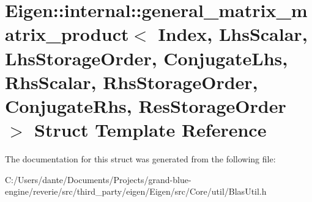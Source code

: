 \hypertarget{struct_eigen_1_1internal_1_1general__matrix__matrix__product}{}\section{Eigen\+::internal\+::general\+\_\+matrix\+\_\+matrix\+\_\+product$<$ Index, Lhs\+Scalar, Lhs\+Storage\+Order, Conjugate\+Lhs, Rhs\+Scalar, Rhs\+Storage\+Order, Conjugate\+Rhs, Res\+Storage\+Order $>$ Struct Template Reference}
\label{struct_eigen_1_1internal_1_1general__matrix__matrix__product}


The documentation for this struct was generated from the following file\+:\begin{DoxyCompactItemize}
\item 
C\+:/\+Users/dante/\+Documents/\+Projects/grand-\/blue-\/engine/reverie/src/third\+\_\+party/eigen/\+Eigen/src/\+Core/util/Blas\+Util.\+h\end{DoxyCompactItemize}
